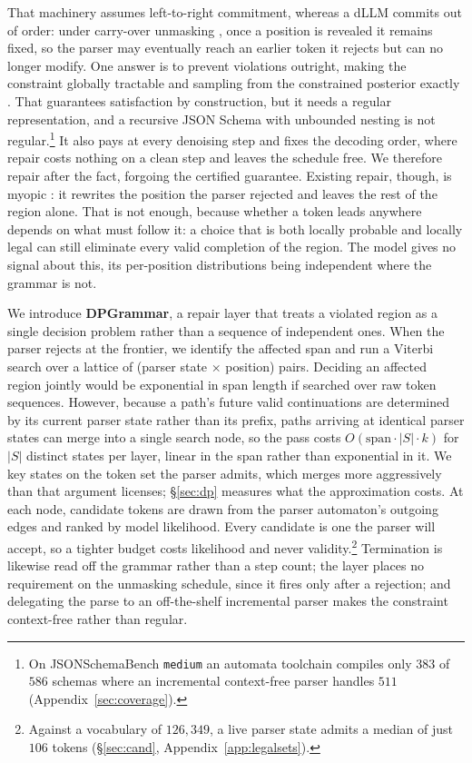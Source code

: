 \documentclass{article}
\begin{document}
That machinery assumes left-to-right commitment, whereas a dLLM commits out of order: under carry-over unmasking \citep{sahoo2024simple,shi2024simplified}, once a position is revealed it remains fixed, so the parser may eventually reach an earlier token it rejects but can no longer modify. One
answer is to prevent violations outright, making the constraint globally
tractable and sampling from the constrained posterior exactly
\citep{suresh2025dingoconstrainedinferencediffusion}. That guarantees
satisfaction by construction, but it needs a regular representation, and a
recursive JSON Schema with unbounded nesting is not
regular.\footnote{On JSONSchemaBench \texttt{medium} an automata toolchain
compiles only $383$ of $586$ schemas where an incremental context-free parser handles
$511$ (Appendix~\ref{sec:coverage}).} It also pays at every denoising step and
fixes the decoding order, where repair costs nothing on a clean step and leaves
the schedule free. We therefore repair after the fact, forgoing the certified
guarantee. Existing repair, though, is myopic
\citep{zhang2026lookaheadthenverifyreliableconstraineddecoding,cd4dllm}: it
rewrites the position the parser rejected and leaves the rest of the region
alone. That is not enough, because whether a token leads anywhere depends on what must
follow it: a choice that is both locally probable and locally legal can still
eliminate every valid completion of the region. The model gives no signal about
this, its per-position distributions being independent where the grammar is
not.

We introduce \textbf{DPGrammar}, a repair layer that treats a violated region as
a single decision problem rather than a sequence of independent ones. When the
parser rejects at the frontier, we identify the affected span and run a Viterbi
search over a lattice of (parser state $\times$ position) pairs. Deciding an affected region jointly would be exponential in span length if searched over raw token sequences. However, because a path's future valid continuations are determined by its current parser state rather than its prefix, paths arriving at identical parser states can merge into a single search node, so the pass costs $O(\text{span}\cdot|S|\cdot k)$ for $|S|$ distinct states per
layer, linear in the span rather than exponential in it. We key states on the token set the parser admits, which merges more aggressively than that argument licenses; \S\ref{sec:dp} measures what the approximation costs. At each node, candidate tokens are drawn from the parser automaton's outgoing edges and ranked by model likelihood. Every candidate is one the parser will accept, so a tighter budget costs likelihood and never validity.\footnote{Against a vocabulary of $126{,}349$, a
live parser state admits a median of just $106$ tokens (\S\ref{sec:cand},
Appendix~\ref{app:legalsets}).} Termination is likewise read off the grammar
rather than a step count; the layer places no requirement on the unmasking
schedule, since it fires only after a rejection; and delegating the parse to an
off-the-shelf incremental parser \citep{microsoft2025llguidance} makes the
constraint context-free rather than regular.
\end{document}

